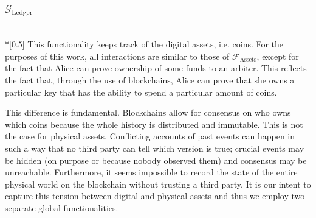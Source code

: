\subsubsection{$\mathcal{G}_{\mathrm{Ledger}}$} \ \\*[0.5\baselineskip]
  This functionality keeps track of the digital assets, i.e. coins. For the purposes of
  this work, all interactions are similar to those of $\mathcal{F}_{\mathrm{Assets}}$,
  except for the fact that Alice can prove ownership of some funds to an arbiter. This
  reflects the fact that, through the use of blockchains, Alice can prove that she owns a
  particular key that has the ability to spend a particular amount of coins.

  This difference is fundamental. Blockchains allow for consensus on who owns which coins
  because the whole history is distributed and immutable. This is not the case for
  physical assets. Conflicting accounts of past events can happen in such a way that no
  third party can tell which version is true; crucial events may be hidden (on purpose or
  because nobody observed them) and consensus may be unreachable. Furthermore, it seems
  impossible to record the state of the entire physical world on the blockchain without
  trusting a third party. It is our intent to capture this tension between digital and
  physical assets and thus we employ two separate global functionalities.
